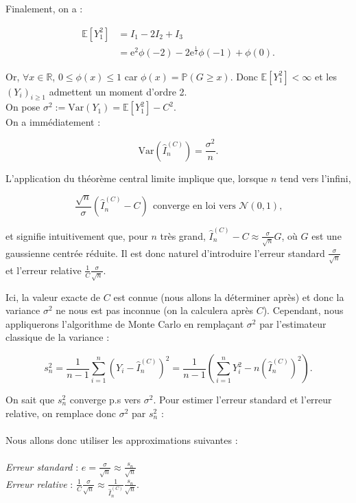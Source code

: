 \documentclass{article}
\theoremstyle{exostyle}
\newenvironment{questions}{
\begin{enumerate}[\hspace{12pt} 1.]}{\end{enumerate}}
\begin{document}
\begin{questions}
Finalement, on a : 

\begin{align*}
    \mathbb{E}\left[ Y_{1}^{2} \right] &= I_{1} - 2I_{2} + I_{3}\\
    &= \text{e}^{2} \phi(-2) -2\text{e}^{\frac{1}{2}} \phi(-1) + \phi(0).
\end{align*}

Or, $\forall x \in \mathbb{R}$, $0 \leq \phi(x) \leq 1$ car $\phi(x) = \mathbb{P} (G \geq x)$. Donc $\mathbb{E}\left[ Y_{1}^{2} \right] < \infty$ et les $(Y_{i})_{i \geq 1}$ admettent un moment d'ordre 2.\\

On pose $\sigma^{2} := \text{Var}(Y_{1}) = \mathbb{E}\left[ Y_{1}^{2} \right] - C^{2}$.\\
On a immédiatement :

\[\text{Var}(\hat{I}_{n}^{(C)}) = \frac{\sigma^{2}}{n}.\]

L'application du théorème central limite implique que, lorsque $n$ tend vers l'infini, 

\[\frac{\sqrt{n}}{\sigma}(\hat{I}_{n}^{(C)} - C) \ \ \text{converge en loi vers $\mathcal{N}(0,1)$,}\]

et signifie intuitivement que, pour $n$ très grand, $\hat{I}_{n}^{(C)} - C \approx \frac{\sigma}{\sqrt{n}}G$, où $G$ est une gaussienne centrée réduite. Il est donc naturel d'introduire l'erreur standard $\frac{\sigma}{\sqrt{n}}$ et l'erreur relative $\frac{1}{C}\frac{\sigma}{\sqrt{n}}$.

Ici, la valeur exacte de $C$ est connue (nous allons la déterminer après) et donc la variance $\sigma^{2}$ ne nous est pas inconnue (on la calculera après $C$). Cependant, nous appliquerons l'algorithme de Monte Carlo en  remplaçant $\sigma^{2}$ par l'estimateur classique de la variance : 

\[s_{n}^{2} = \frac{1}{n-1} \sum_{i=1}^{n} \left( Y_{i} - \hat{I}_{n}^{(C)} \right)^{2} = \frac{1}{n-1} \left( \sum_{i=1}^{n} Y_{i}^{2} - n(\hat{I}_{n}^{(C)})^{2} \right).\]

On sait que $s_{n}^{2}$ converge p.s vers $\sigma^{2}$. Pour estimer l'erreur standard et l'erreur relative, on remplace donc $\sigma^{2}$ par $s_{n}^{2}$ :\\
\\
Nous allons donc utiliser les approximations suivantes :\\
\\
\textit{Erreur standard} : $e = \frac{\sigma}{\sqrt{n}} \approx \frac{s_{n}}{\sqrt{n}}$\\
\textit{Erreur relative} : $\frac{1}{C}\frac{\sigma}{\sqrt{n}} \approx \frac{1}{\hat{I}_{n}^{(C)}}\frac{s_{n}}{\sqrt{n}}$.


\end{questions}
\end{document}

